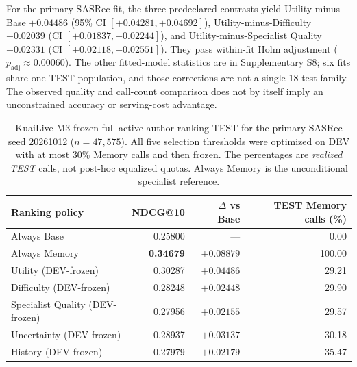 For the primary SASRec fit, the three predeclared contrasts yield Utility-minus-Base $+0.04486$ (95\% CI $[+0.04281,+0.04692]$), Utility-minus-Difficulty $+0.02039$ (CI $[+0.01837,+0.02244]$), and Utility-minus-Specialist Quality $+0.02331$ (CI $[+0.02118,+0.02551]$). They pass within-fit Holm adjustment ($p_{\mathrm{adj}}\approx0.00060$). The other fitted-model statistics are in Supplementary S8; six fits share one TEST population, and those corrections are not a single 18-test family. The observed quality and call-count comparison does not by itself imply an unconstrained accuracy or serving-cost advantage.

\begin{table}[!htbp]
\centering
\caption{KuaiLive-M3 frozen full-active author-ranking TEST for the primary SASRec seed 20261012 ($n=47{,}575$). All five selection thresholds were optimized on DEV with at most 30\% Memory calls and then frozen. The percentages are \emph{realized TEST} calls, not post-hoc equalized quotas. Always Memory is the unconditional specialist reference.}
\label{tab:results-m3-policy}
\footnotesize
\setlength{\tabcolsep}{5pt}
\begin{tabular}{@{}lrrr@{}}
\toprule
Ranking policy & NDCG@10 & $\Delta$ vs Base & TEST Memory calls (\%) \\
\midrule
Always Base & 0.25800 & --- & 0.00 \\
Always Memory & \textbf{0.34679} & $+0.08879$ & 100.00 \\
Utility (DEV-frozen) & 0.30287 & $+0.04486$ & 29.21 \\
Difficulty (DEV-frozen) & 0.28248 & $+0.02448$ & 29.90 \\
Specialist Quality (DEV-frozen) & 0.27956 & $+0.02155$ & 29.57 \\
Uncertainty (DEV-frozen) & 0.28937 & $+0.03137$ & 30.18 \\
History (DEV-frozen) & 0.27979 & $+0.02179$ & 35.47 \\
\bottomrule
\end{tabular}
\end{table}

